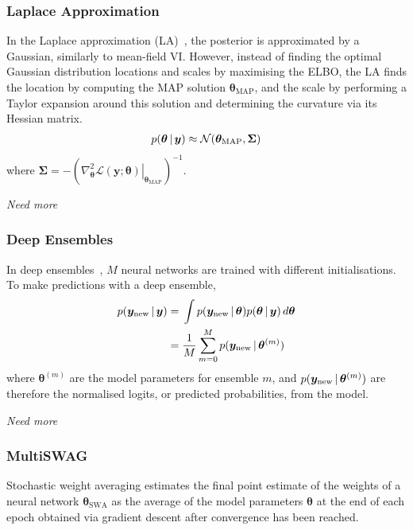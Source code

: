 \documentclass[10pt,a4paper,twocolumn]{article}
\begin{document}
\subsubsection{Laplace Approximation}
In the Laplace approximation (LA)~\cite{daxberger2021laplace}, the posterior is approximated by a Gaussian, similarly to mean-field VI.
However, instead of finding the optimal Gaussian distribution locations and scales by maximising the ELBO, the LA finds the location by computing the MAP solution \(\bm \theta_{\text{MAP}}\), and the scale by performing a Taylor expansion around this solution and determining the curvature via its Hessian matrix.
\begin{align}
    p(\bm{\theta} \, | \, \bm y) \approx \mathcal{N}(\bm \theta_{\text{MAP}}, \bm\Sigma)
\end{align}
where \(\bm\Sigma = -(\left.\nabla^2_{\bm \theta} \mathcal{L}(\bm y; \bm \theta) \right|_{\bm \theta_\mathrm{MAP}})^{-1}\).

\emph{Need more}

\subsubsection{Deep Ensembles}
In deep ensembles~\cite{lakshminarayanan2017simple}, \(M\) neural networks are trained with different initialisations.
To make predictions with a deep ensemble,
\begin{align}
    p(\bm y_{\mathrm{new}} \, | \, \bm y)
    ={} & \int p(\bm y_{\mathrm{new}} \, | \, \bm \theta) p(\bm \theta \, | \, \bm y)\,d\bm\theta \nonumber \\
    ={} & \frac{1}{M} \sum_{m=0}^M p(\bm y_{\mathrm{new}} \, | \, \bm\theta^{(m)})
\end{align}
where \(\bm\theta^{(m)}\) are the model parameters for ensemble \(m\), and \(p(\bm y_{\mathrm{new}} \, | \, \bm\theta^{(m)})\) are therefore the normalised logits, or predicted probabilities, from the model.

\emph{Need more}

\subsubsection{MultiSWAG}

Stochastic weight averaging estimates the final point estimate of the weights of a neural network \(\bm \theta_\mathrm{SWA}\) as the average of the model parameters \(\bm \theta\) at the end of each epoch obtained via gradient descent after convergence has been reached.
\end{document}
